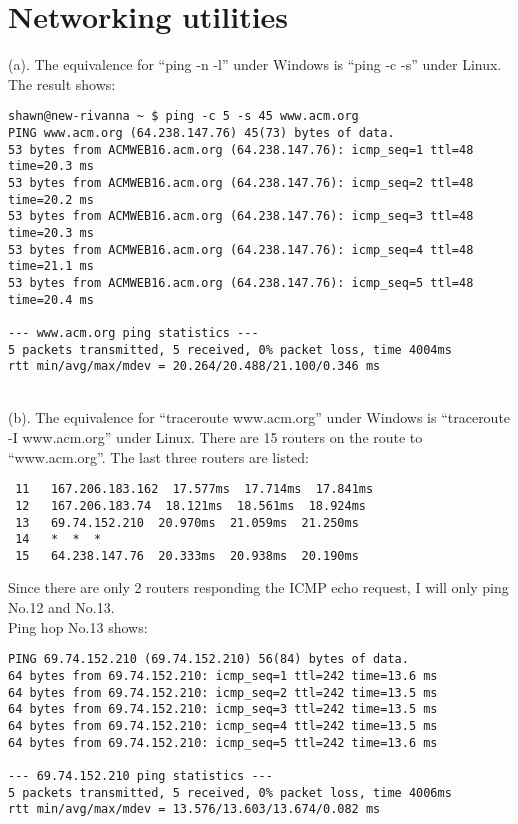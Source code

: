 \documentclass[titlepage, paper=a4, fontsize=11pt]{scrartcl} %
\numberwithin{equation}{section} %
\numberwithin{figure}{section} %
\numberwithin{table}{section} %
\begin{document}

\section*{Networking utilities}
(a). The equivalence for ``ping -n -l'' under Windows is ``ping -c -s'' under Linux.
The result shows:
\begin{lstlisting}
shawn@new-rivanna ~ $ ping -c 5 -s 45 www.acm.org
PING www.acm.org (64.238.147.76) 45(73) bytes of data.
53 bytes from ACMWEB16.acm.org (64.238.147.76): icmp_seq=1 ttl=48 time=20.3 ms
53 bytes from ACMWEB16.acm.org (64.238.147.76): icmp_seq=2 ttl=48 time=20.2 ms
53 bytes from ACMWEB16.acm.org (64.238.147.76): icmp_seq=3 ttl=48 time=20.3 ms
53 bytes from ACMWEB16.acm.org (64.238.147.76): icmp_seq=4 ttl=48 time=21.1 ms
53 bytes from ACMWEB16.acm.org (64.238.147.76): icmp_seq=5 ttl=48 time=20.4 ms

--- www.acm.org ping statistics ---
5 packets transmitted, 5 received, 0% packet loss, time 4004ms
rtt min/avg/max/mdev = 20.264/20.488/21.100/0.346 ms
\end{lstlisting}
~\\[18pt]
(b). The equivalence for ``traceroute www.acm.org'' under Windows is ``traceroute -I www.acm.org'' under Linux.
There are 15 routers on the route to ``www.acm.org''. The last three routers are listed:
\begin{lstlisting}
 11   167.206.183.162  17.577ms  17.714ms  17.841ms 
 12   167.206.183.74  18.121ms  18.561ms  18.924ms 
 13   69.74.152.210  20.970ms  21.059ms  21.250ms 
 14   *  *  * 
 15   64.238.147.76  20.333ms  20.938ms  20.190ms
\end{lstlisting}
Since there are only 2 routers responding the ICMP echo request, I will only ping No.12 and No.13. \\
Ping hop No.13 shows:
\begin{lstlisting}
PING 69.74.152.210 (69.74.152.210) 56(84) bytes of data.
64 bytes from 69.74.152.210: icmp_seq=1 ttl=242 time=13.6 ms
64 bytes from 69.74.152.210: icmp_seq=2 ttl=242 time=13.5 ms
64 bytes from 69.74.152.210: icmp_seq=3 ttl=242 time=13.5 ms
64 bytes from 69.74.152.210: icmp_seq=4 ttl=242 time=13.5 ms
64 bytes from 69.74.152.210: icmp_seq=5 ttl=242 time=13.6 ms

--- 69.74.152.210 ping statistics ---
5 packets transmitted, 5 received, 0% packet loss, time 4006ms
rtt min/avg/max/mdev = 13.576/13.603/13.674/0.082 ms
\end{lstlisting}
\end{document}
